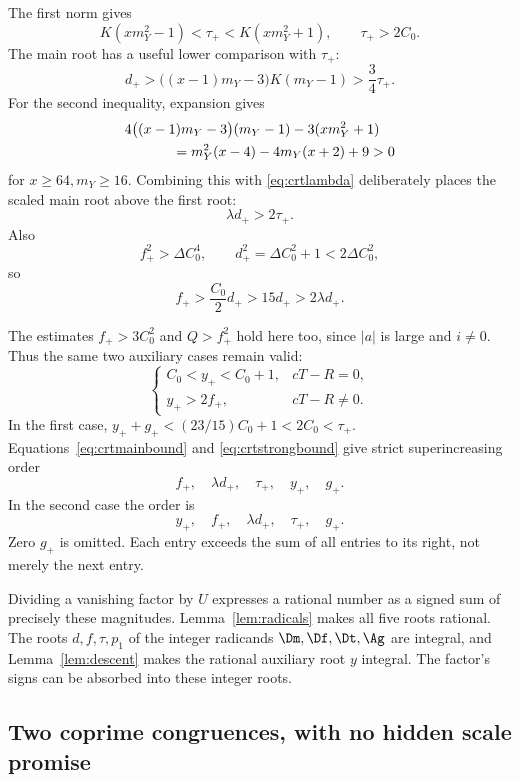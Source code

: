 The first norm gives
\begin{equation}
K(xm_Y^2-1)<\tau_+<K(xm_Y^2+1),\qquad \tau_+>2C_0.
\label{eq:crttaubound}
\end{equation}
The main root has a useful lower comparison with \(\tau_+\):
\[
d_+>\bigl((x-1)m_Y-3\bigr)K(m_Y-1)>\frac34\tau_+.
\]
For the second inequality, expansion gives
\begin{align*}
&4\bigl((x-1)m_Y-3\bigr)(m_Y-1)-3(xm_Y^2+1)\\
&\hspace{12mm}=m_Y^2(x-4)-4m_Y(x+2)+9>0
\end{align*}
for \(x\ge64,m_Y\ge16\). Combining this with
\eqref{eq:crtlambda} deliberately places the scaled main root above
the first root:
\begin{equation}
\lambda d_+>2\tau_+.
\label{eq:crtmainbound}
\end{equation}
Also
\[
f_+^2>\Delta C_0^4,\qquad
d_+^2=\Delta C_0^2+1<2\Delta C_0^2,
\]
so
\begin{equation}
f_+>\frac{C_0}{2}d_+>15d_+>2\lambda d_+.
\label{eq:crtstrongbound}
\end{equation}

The estimates \(f_+>3C_0^2\) and \(Q>f_+^2\) hold here too,
since \(|a|\) is large and \(i\ne0\). Thus the same two auxiliary
cases remain valid:
\begin{equation}
\begin{cases}
C_0<y_+<C_0+1,&cT-R=0,\\
y_+>2f_+,&cT-R\ne0.
\end{cases}
\label{eq:crtycases}
\end{equation}
In the first case,
\(y_++g_+<(23/15)C_0+1<2C_0<\tau_+\).
Equations~\eqref{eq:crtmainbound} and \eqref{eq:crtstrongbound}
give strict superincreasing order
\[
f_+,\quad \lambda d_+,\quad \tau_+,\quad y_+,\quad g_+.
\]
In the second case the order is
\[
y_+,\quad f_+,\quad \lambda d_+,\quad \tau_+,\quad g_+.
\]
Zero \(g_+\) is omitted. Each entry exceeds the sum of all entries
to its right, not merely the next entry.

Dividing a vanishing factor by \(U\) expresses a rational number
as a signed sum of precisely these magnitudes. Lemma~\ref{lem:radicals}
makes all five roots rational. The roots \(d,f,\tau,p_1\) of the
integer radicands \(\Dm,\Df,\Dt,\Ag\) are integral, and
Lemma~\ref{lem:descent} makes the rational auxiliary root \(y\)
integral. The factor's signs can be absorbed into these integer roots.

\subsection{Two coprime congruences, with no hidden scale promise}

